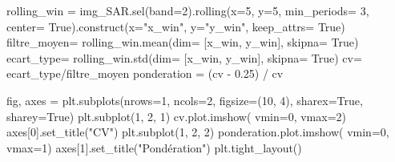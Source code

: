 \documentclass[
  french,
  11pt,
  letterpaper,
  open=any,
  twoside=false,
  french]{scrbook}
\newenvironment{Shaded}{\begin{snugshade}}{\end{snugshade}}
\newcommand{\DecValTok}[1]{\textcolor[rgb]{0.68,0.00,0.00}{#1}}
\newcommand{\FloatTok}[1]{\textcolor[rgb]{0.68,0.00,0.00}{#1}}
\newcommand{\NormalTok}[1]{\textcolor[rgb]{0.00,0.23,0.31}{#1}}
\newcommand{\OperatorTok}[1]{\textcolor[rgb]{0.37,0.37,0.37}{#1}}
\newcommand{\StringTok}[1]{\textcolor[rgb]{0.13,0.47,0.30}{#1}}
\newcommand{\VariableTok}[1]{\textcolor[rgb]{0.07,0.07,0.07}{#1}}
\begin{document}
\begin{Shaded}
\begin{Highlighting}[]
\NormalTok{rolling\_win }\OperatorTok{=}\NormalTok{ img\_SAR.sel(band}\OperatorTok{=}\DecValTok{2}\NormalTok{).rolling(x}\OperatorTok{=}\DecValTok{5}\NormalTok{, y}\OperatorTok{=}\DecValTok{5}\NormalTok{,  min\_periods}\OperatorTok{=} \DecValTok{3}\NormalTok{, center}\OperatorTok{=} \VariableTok{True}\NormalTok{).construct(x}\OperatorTok{=}\StringTok{"x\_win"}\NormalTok{, y}\OperatorTok{=}\StringTok{"y\_win"}\NormalTok{, keep\_attrs}\OperatorTok{=} \VariableTok{True}\NormalTok{)}
\NormalTok{filtre\_moyen}\OperatorTok{=}\NormalTok{ rolling\_win.mean(dim}\OperatorTok{=}\NormalTok{ [}\StringTok{\textquotesingle{}x\_win\textquotesingle{}}\NormalTok{, }\StringTok{\textquotesingle{}y\_win\textquotesingle{}}\NormalTok{], skipna}\OperatorTok{=} \VariableTok{True}\NormalTok{)}
\NormalTok{ecart\_type}\OperatorTok{=}\NormalTok{ rolling\_win.std(dim}\OperatorTok{=}\NormalTok{ [}\StringTok{\textquotesingle{}x\_win\textquotesingle{}}\NormalTok{, }\StringTok{\textquotesingle{}y\_win\textquotesingle{}}\NormalTok{], skipna}\OperatorTok{=} \VariableTok{True}\NormalTok{)}
\NormalTok{cv}\OperatorTok{=}\NormalTok{ ecart\_type}\OperatorTok{/}\NormalTok{filtre\_moyen}
\NormalTok{ponderation }\OperatorTok{=}\NormalTok{ (cv }\OperatorTok{{-}} \FloatTok{0.25}\NormalTok{) }\OperatorTok{/}\NormalTok{ cv}

\NormalTok{fig, axes }\OperatorTok{=}\NormalTok{ plt.subplots(nrows}\OperatorTok{=}\DecValTok{1}\NormalTok{, ncols}\OperatorTok{=}\DecValTok{2}\NormalTok{, figsize}\OperatorTok{=}\NormalTok{(}\DecValTok{10}\NormalTok{, }\DecValTok{4}\NormalTok{), sharex}\OperatorTok{=}\VariableTok{True}\NormalTok{, sharey}\OperatorTok{=}\VariableTok{True}\NormalTok{)}
\NormalTok{plt.subplot(}\DecValTok{1}\NormalTok{, }\DecValTok{2}\NormalTok{, }\DecValTok{1}\NormalTok{)}
\NormalTok{cv.plot.imshow( vmin}\OperatorTok{=}\DecValTok{0}\NormalTok{, vmax}\OperatorTok{=}\DecValTok{2}\NormalTok{)}
\NormalTok{axes[}\DecValTok{0}\NormalTok{].set\_title(}\StringTok{"CV"}\NormalTok{)}
\NormalTok{plt.subplot(}\DecValTok{1}\NormalTok{, }\DecValTok{2}\NormalTok{, }\DecValTok{2}\NormalTok{)}
\NormalTok{ponderation.plot.imshow( vmin}\OperatorTok{=}\DecValTok{0}\NormalTok{, vmax}\OperatorTok{=}\DecValTok{1}\NormalTok{) }
\NormalTok{axes[}\DecValTok{1}\NormalTok{].set\_title(}\StringTok{"Pondération"}\NormalTok{)}
\NormalTok{plt.tight\_layout()}
\end{Highlighting}
\end{Shaded}
\end{document}
